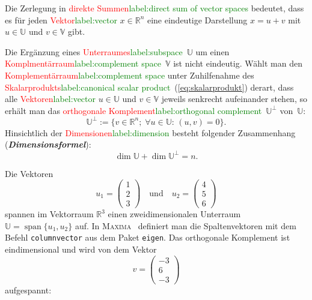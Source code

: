 \documentclass[a4paper,twoside,english,ngerman,deutsch,german,sectrefs,envcountsame,envcountchap]{svmono}
\newcommand{\setref}[2]{\textcolor{red}{#1}\textcolor{green}{#2}}
\begin{document}
Die Zerlegung in \setref{direkte Summen}{label:direct sum of vector spaces} bedeutet, dass es für jeden \setref{Vektor}{label:vector} $x\in{\mathbb{R}}^{n}$ eine eindeutige Darstellung $x=u+v$ mit $u\in\mathbb{U}$ und $v\in\mathbb{V}$ gibt.

Die Ergänzung eines \setref{Unterraumes}{label:subspace}~$\mathbb{U}$ um einen \setref{Komplmentärraum}{label:complement space}~$\mathbb{V}$ ist nicht eindeutig. Wählt man den \setref{Komplementärraum}{label:complement space} unter Zuhilfenahme des \setref{Skalarprodukts}{label:canonical scalar product}~(\ref{eq:skalarprodukt}) derart, dass alle \setref{Vektoren}{label:vector} $u\in\mathbb{U}$ und $v\in\mathbb{V}$ jeweils senkrecht aufeinander stehen, so erhält man das \setref{orthogonale Komplement}{label:orthogonal complement}~$\mathbb{U}^{\perp}$ von~$\mathbb{U}$:
\begin{equation}
\mathbb{U}^{\perp}:=\{v\in{\mathbb{R}}^{n};\;\forall u\in\mathbb{U}:\,(u,v)=0\}.\label{eq:ortho-komplement}
\end{equation}
Hinsichtlich der \setref{Dimensionen}{label:dimension} besteht folgender Zusammenhang (\textbf{\em Dimensionsformel}):
\begin{equation}
\dim\mathbb{U}+\dim\mathbb{U}^{\perp}=n.\label{eq:dimensionsformel-ortho-kompl}
\end{equation}


\begin{example}
\label{exa:orthogonales-Komplement}Die Vektoren
\[
u_{1}=\left(\begin{array}{c} 1\\ 2\\ 3
\end{array}\right)\quad\text{und}\quad u_{2}=\left(\begin{array}{c}
4\\ 5\\ 6
\end{array}\right)
\]
spannen im Vektorraum ${\mathbb{R}}^{3}$ einen zweidimensionalen Unterraum $\mathbb{U}={\operatorname{span}}\{u_{1},u_{2}\}$ auf. In \textsc{Maxima}~\cite{maxima,haager2014} definiert man die Spaltenvektoren mit dem Befehl \texttt{columnvector} aus dem Paket \texttt{eigen}. Das orthogonale Komplement ist eindimensional und wird von dem Vektor
\[
v=\left(\begin{array}{c} -3\\ 6\\ -3
\end{array}\right)
\]
aufgespannt:


\end{example}
\end{document}
